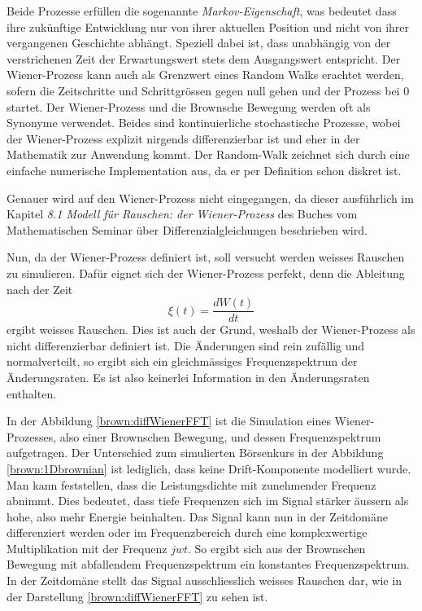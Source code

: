 Beide Prozesse erfüllen die sogenannte \textit{Markov-Eigenschaft}, was bedeutet dass ihre zukünftige Entwicklung nur von ihrer aktuellen Position und nicht von ihrer vergangenen Geschichte abhängt. Speziell dabei ist, dass unabhängig von der verstrichenen Zeit der Erwartungswert stets dem Ausgangswert entspricht. Der Wiener-Prozess kann auch als Grenzwert eines Random Walks erachtet werden, sofern die Zeitschritte und Schrittgrössen gegen null gehen und der Prozess bei 0 startet. Der Wiener-Prozess und die Brownsche Bewegung werden oft als Synonyme verwendet. Beides sind kontinuierliche stochastische Prozesse, wobei der Wiener-Prozess explizit nirgends differenzierbar ist und eher in der Mathematik zur Anwendung kommt. Der Random-Walk zeichnet sich durch eine einfache numerische Implementation aus, da er per Definition schon diskret ist.


Genauer wird auf den Wiener-Prozess nicht eingegangen, da dieser ausführlich im Kapitel \textit{8.1 Modell für Rauschen: der Wiener-Prozess} des Buches \cite{brown:Differenzialgleichungen} vom Mathematischen Seminar über Differenzialgleichungen beschrieben wird.


Nun, da der Wiener-Prozess definiert ist, soll versucht werden weisses Rauschen zu simulieren. Dafür eignet sich der Wiener-Prozess perfekt, denn die Ableitung nach der Zeit
\begin{equation}
	\xi(t) = \frac{dW(t)}{dt}
\end{equation}
ergibt weisses Rauschen. Dies ist auch der Grund, weshalb der Wiener-Prozess als nicht differenzierbar definiert ist. Die Änderungen sind rein zufällig und normalverteilt, so ergibt sich ein gleichmässiges Frequenzspektrum der Änderungsraten. Es ist also keinerlei Information in den Änderungsraten enthalten.


In der Abbildung \ref{brown:diffWienerFFT} ist die Simulation eines Wiener-Prozesses, also einer Brownschen Bewegung, und dessen Frequenzspektrum aufgetragen. Der Unterschied zum simulierten Börsenkurs in der Abbildung \ref{brown:1Dbrownian} ist lediglich, dass keine Drift-Komponente modelliert wurde. Man kann feststellen, dass die Leistungsdichte mit zunehmender Frequenz abnimmt. Dies bedeutet, dass tiefe Frequenzen sich im Signal stärker äussern als hohe, also mehr Energie beinhalten. Das Signal kann nun in der Zeitdomäne differenziert werden oder im Frequenzbereich durch eine komplexwertige Multiplikation mit der Frequenz $ jwt $. So ergibt sich aus der Brownschen Bewegung mit abfallendem Frequenzspektrum ein konstantes Frequenzspektrum. In der Zeitdomäne stellt das Signal ausschliesslich weisses Rauschen dar, wie in der Darstellung \ref{brown:diffWienerFFT} zu sehen ist.

